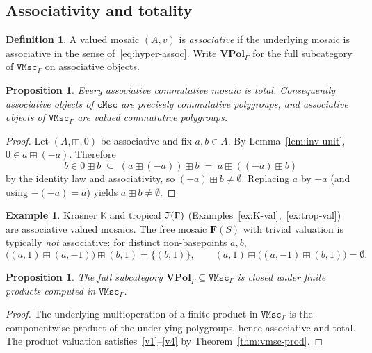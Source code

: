 \documentclass[11pt]{amsart}
\theoremstyle{plain}
\newtheorem{proposition}[theorem]{Proposition}
\theoremstyle{definition}
\newtheorem{definition}[theorem]{Definition}
\newtheorem{example}[theorem]{Example}
\theoremstyle{remark}
\newcommand{\T}{\EuScript{T}}
\newcommand{\cMsc}{\mathtt{cMsc}}
\newcommand{\VMscG}{\mathtt{VMsc}_{\Gamma}}
\begin{document}
\subsection{Associativity and totality}

\begin{definition}
\label{def:assoc-valued}
A valued mosaic \((A,v)\) is \emph{associative} if the underlying mosaic is associative in the sense of~\eqref{eq:hyper-assoc}. Write \(\mathbf{VPol}_\Gamma\) for the full subcategory of \(\VMscG\) on associative objects.
\end{definition}

\begin{proposition}
\label{prop:asc-total}
Every associative commutative mosaic is total. Consequently associative objects of \(\cMsc\) are precisely commutative polygroups, and associative objects of \(\VMscG\) are valued commutative polygroups.
\end{proposition}

\begin{proof}
Let \((A,\boxplus,0)\) be associative and fix \(a,b\in A\). By Lemma~\ref{lem:inv-unit}, \(0\in a\boxplus(-a)\). Therefore
\[
b\in 0\boxplus b\;\subseteq\;(a\boxplus(-a))\boxplus b\;=\;a\boxplus((-a)\boxplus b)
\]
by the identity law and associativity, so \((-a)\boxplus b\neq\emptyset\). Replacing \(a\) by \(-a\) (and using \(-(-a)=a\)) yields \(a\boxplus b\neq\emptyset\).
\end{proof}

\begin{example}
\label{ex:assoc-examples}
Krasner \(\mathbb{K}\) and tropical \(\T(\Gamma)\) (Examples~\ref{ex:K-val},~\ref{ex:trop-val}) are associative valued mosaics. The free mosaic \(\mathbf{F}(S)\) with trivial valuation is typically \emph{not} associative: for distinct non-basepoints \(a,b\),
\[
\bigl((a,1)\boxplus(a,-1)\bigr)\boxplus(b,1)=\{(b,1)\},
\qquad
(a,1)\boxplus\bigl((a,-1)\boxplus(b,1)\bigr)=\emptyset.
\]
\end{example}

\begin{proposition}
\label{prop:VPol-products}
The full subcategory \(\mathbf{VPol}_\Gamma\subseteq\VMscG\) is closed under finite products computed in \(\VMscG\).
\end{proposition}

\begin{proof}
The underlying multioperation of a finite product in \(\VMscG\) is the componentwise product of the underlying polygroups, hence associative and total. The product valuation satisfies~\eqref{v1}--\eqref{v4} by Theorem~\ref{thm:vmsc-prod}.
\end{proof}
\end{document}
